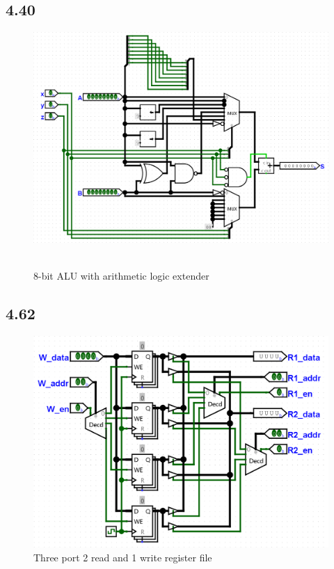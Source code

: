 \documentclass{article}
\begin{document}
\subsection*{4.40}
\begin{figure}[H]
    \centering
    \includegraphics[width=0.9\linewidth]{./images/4.40.png}\
    \caption*{8-bit ALU with arithmetic logic extender}
\end{figure}

\subsection*{4.62}
\begin{figure}[H]
    \centering
    \includegraphics[width=0.8\linewidth]{./images/4.62.png}
    \caption*{Three port 2 read and 1 write register file}
\end{figure}
\end{document}
